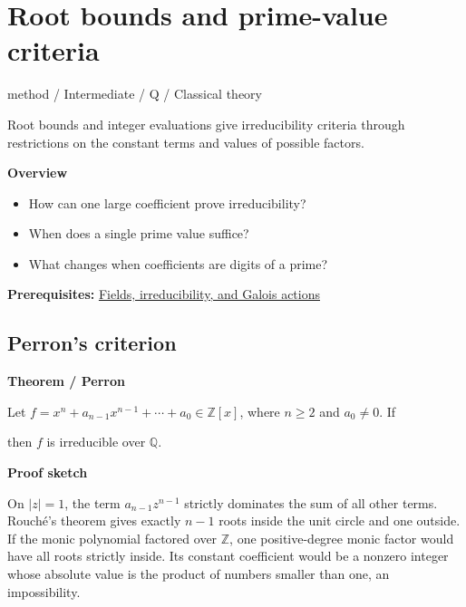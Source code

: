 \documentclass[11pt,a4paper,oneside,openany]{book}
\newcommand{\atlasdisplay}[1]{\par\begingroup\centering\vspace{3pt}\noindent\adjustbox{max width=\linewidth}{\(\displaystyle #1\)}\par\vspace{5pt}\endgroup}
\begin{document}
\chapter{Root bounds and prime-value criteria}\label{article:archimedean-criteria}\hypertarget{article:archimedean-criteria}{}\color{black}
{\sffamily\small\color{atlasgold}method / Intermediate / Q / Classical theory}\par\medskip
Root bounds and integer evaluations give irreducibility criteria through restrictions on the constant terms and values of possible factors.\par\medskip
\textbf{Overview}\begin{itemize}
\item How can one large coefficient prove irreducibility?
\item When does a single prime value suffice?
\item What changes when coefficients are digits of a prime?
\end{itemize}
{\small\textbf{Prerequisites:} \hyperlink{article:foundations}{Fields, irreducibility, and Galois actions}}\par
{}\section{Perron's criterion}

\begin{atlasblock}[standard]
\textbf{\sffamily Theorem  /  Perron}\par\smallskip
\color{black} Let \(f=x^n+a_{n-1}x^{n-1}+\cdots+a_0\in\mathbb Z[x]\), where \(n\ge2\) and \(a_0\ne0\). If\par

\atlasdisplay{|a_{n-1}|>1+\sum_{i=0}^{n-2}|a_i|,}
\color{black} then \(f\) is irreducible over \(\mathbb Q\).\par
\end{atlasblock}\color{black}


\begin{atlasblock}[standard]
\textbf{\sffamily Proof sketch}\par\smallskip
\color{black} On \(|z|=1\), the term \(a_{n-1}z^{n-1}\) strictly dominates the sum of all other terms. Rouché's theorem gives exactly \(n-1\) roots inside the unit circle and one outside. If the monic polynomial factored over \(\mathbb Z\), one positive-degree monic factor would have all roots strictly inside. Its constant coefficient would be a nonzero integer whose absolute value is the product of numbers smaller than one, an impossibility.\par
\end{atlasblock}\color{black}
\end{document}
